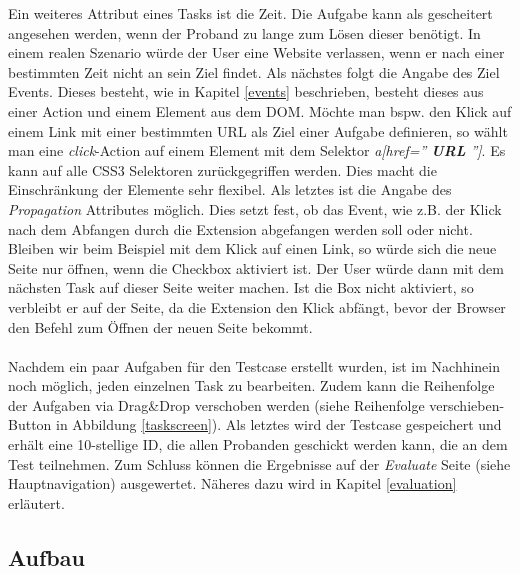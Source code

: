 Ein weiteres Attribut eines Tasks ist die Zeit. Die Aufgabe kann als gescheitert angesehen werden, wenn der Proband zu lange zum Lösen dieser benötigt. In einem realen Szenario würde der User eine Website verlassen, wenn er nach einer bestimmten Zeit nicht an sein Ziel findet. Als nächstes folgt die Angabe des Ziel Events. Dieses besteht, wie in Kapitel \ref{events} beschrieben, besteht dieses aus einer Action und einem Element aus dem DOM. Möchte man bspw. den Klick auf einem Link mit einer bestimmten URL als Ziel einer Aufgabe definieren, so wählt man eine \textit{click}-Action auf einem Element mit dem Selektor \textit{a[href=''\textbf{ URL }'']}. Es kann auf alle CSS3 Selektoren zurückgegriffen werden. Dies macht die Einschränkung der Elemente sehr flexibel. Als letztes ist die Angabe des \textit{Propagation} Attributes möglich. Dies setzt fest, ob das Event, wie z.B. der Klick nach dem Abfangen durch die Extension abgefangen werden soll oder nicht. Bleiben wir beim Beispiel mit dem Klick auf einen Link, so würde sich die neue Seite nur öffnen, wenn die Checkbox aktiviert ist. Der User würde dann mit dem nächsten Task auf dieser Seite weiter machen. Ist die Box nicht aktiviert, so verbleibt er auf der Seite, da die Extension den Klick abfängt, bevor der Browser den Befehl zum Öffnen der neuen Seite bekommt.\\
\\
Nachdem ein paar Aufgaben für den Testcase erstellt wurden, ist im Nachhinein noch möglich, jeden einzelnen Task zu bearbeiten. Zudem kann die Reihenfolge der Aufgaben via Drag\&Drop verschoben werden (siehe \glqq Reihenfolge verschieben\grqq{}-Button in Abbildung \ref{taskscreen}). Als letztes wird der Testcase gespeichert und erhält eine 10-stellige ID, die allen Probanden geschickt werden kann, die an dem Test teilnehmen. Zum Schluss können die Ergebnisse auf der \textit{Evaluate} Seite (siehe Hauptnavigation) ausgewertet. Näheres dazu wird in Kapitel \ref{evaluation} erläutert.


\subsection{Aufbau}

